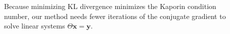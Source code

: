 \documentclass{beamer}                             %
\renewcommand{\vec}[1]{\bm{#1}}
\newcommand*{\CM}{\Theta}
\begin{document}
\begin{frame}[t]
\begin{columns}[T]
\begin{column}{0.30\textwidth}
\begin{tcolorbox}
    \begin{columns}
      \begin{column}{0.5\textwidth}
        Because minimizing KL divergence minimizes the Kaporin condition
        number, our method needs fewer iterations of the conjugate
        gradient to solve linear systems \( \CM \vec{x} = \vec{y} \).
      \end{column}
      \begin{column}{0.5\textwidth}
        \begin{figure}[t]
          \centering
          
          \label{fig:cg_iter}
        \end{figure}
      \end{column}
    \end{columns}
  \end{tcolorbox}

\end{column}

\end{columns}


\end{frame}
\end{document}
